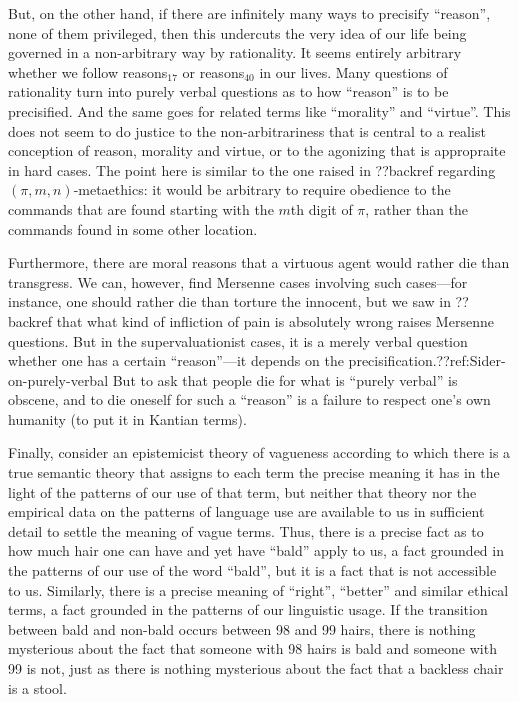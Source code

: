 But, on the other hand, if there are infinitely many ways to precisify ``reason'', none of them privileged, then this undercuts the very idea of our life being governed in
a non-arbitrary way by rationality. It seems entirely arbitrary whether we follow reasons$_{17}$ or reasons$_{40}$ in our lives. Many questions of rationality
turn into purely verbal questions as to how ``reason'' is to be precisified. And the same goes for related terms like ``morality'' and ``virtue''. This 
does not seem to do justice to the non-arbitrariness that is central to a realist conception of reason, morality and virtue, or to the agonizing that is appropraite in hard cases. The point here is similar to the
one raised in ??backref regarding $(\pi,m,n)$-metaethics: it would be arbitrary to require obedience to the commands that are found starting with the $m$th digit of $\pi$,
rather than the commands found in some other location. 

Furthermore, there are moral reasons that a virtuous agent would rather die than transgress. We can, however, 
find Mersenne cases involving such cases---for instance, one should rather die than torture the innocent, but 
we saw in ??backref that what kind of infliction of pain is absolutely wrong raises Mersenne questions. But 
in the supervaluationist cases, it is a merely verbal question whether one has a certain ``reason''---it depends
on the precisification.??ref:Sider-on-purely-verbal But to ask that people die for what is ``purely verbal'' is
obscene, and to die oneself for such a ``reason'' is a failure to respect one's own humanity (to put it in Kantian
terms).


Finally, consider an epistemicist theory of vagueness according to which there is a true semantic theory that assigns to each term the precise meaning it has in the
light of the patterns of our use of that term, but neither that theory nor the empirical data on the patterns of language use are available
to us in sufficient detail to settle the meaning of vague terms.  Thus, there is a precise fact as to how much hair one can have
and yet have ``bald'' apply to us, a fact grounded in the patterns of our use of the word ``bald'', but it is a fact that is not accessible to us. Similarly, there is
a precise meaning of ``right'', ``better'' and similar ethical terms, a fact grounded in the patterns of our linguistic usage. If the transition between bald and non-bald occurs
between 98 and 99 hairs, there is nothing mysterious about the fact that someone with 98 hairs is bald and someone with 99 is not, just as there is nothing mysterious
about the fact that a backless chair is a stool. 

